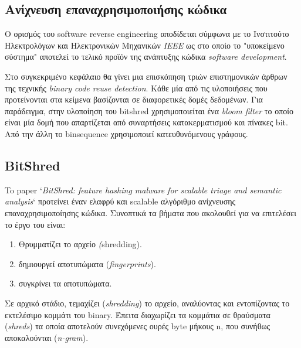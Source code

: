 \subsection{Ανίχνευση επαναχρησιμοποιήσης κώδικα}
Ο ορισμός του software reverse engineering αποδίδεται σύμφωνα με το Ινστιτούτο Ηλεκτρολόγων και Ηλεκτρονικών Μηχανικών \emph{IEEE} ως 
\cite{reverse}
στο οποίο το "υποκείμενο σύστημα" αποτελεί το τελικό προϊόν της ανάπτυξης κώδικα \emph{software development}.


Στο συγκεκριμένο κεφάλαιο θα γίνει μια επισκόπηση τριών επιστημονικών άρθρων της τεχνικής \emph{binary code reuse detection}.
Κάθε μία από τις υλοποιήσεις που προτείνονται στα κείμενα βασίζονται σε διαφορετικές δομές δεδομένων.
Για παράδειγμα, στην υλοποίηση του bitshred\cite{bitshred} χρησιμοποιείται ένα \emph{bloom filter} το οποίο είναι μία δομή που απαρτίζεται από συναρτήσεις κατακερματισμού και πίνακες bit. Από την άλλη το binsequence χρησιμοποιεί κατευθυνόμενους γράφους.

\pagebreak
\subsection{BitShred}
To paper `\emph{BitShred: feature hashing malware for scalable triage and semantic analysis}`\cite{bitshred} προτείνει έναν ελαφρύ και scalable αλγόριθμο ανίχνευσης επαναχρησιμοποίησης κώδικα. Συνοπτικά τα βήματα που ακολουθεί για να επιτελέσει το έργο του είναι:

\begin{enumerate}
    \item Θρυμματίζει το αρχείο \emph(shredding).
    \item δημιουργεί αποτυπώματα (\emph{fingerprints}). 
    \item συγκρίνει τα αποτυπώματα.
\end{enumerate}

Σε αρχικό στάδιο, τεμαχίζει (\emph{shredding}) το αρχείο, αναλύοντας και εντοπίζοντας το εκτελέσιμο κομμάτι του binary.
Έπειτα διαχωρίζει τα κομμάτια σε θραύσματα (\emph{shreds}) τα οποία αποτελούν συνεχόμενες ουρές byte μήκους n, που συνήθως αποκαλούνται (\emph{n-gram}).

